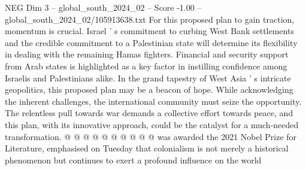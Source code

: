 \begin{textsample}{NEG Dim 3 – global\_south\_2024\_02 – Score -1.00 – global\_south\_2024\_02/105913638.txt}
For this proposed plan to gain traction, momentum is crucial.
Israel ' s commitment to curbing West Bank settlements and the credible commitment to a Palestinian state will determine its flexibility in dealing with the remaining Hamas fighters.
Financial and security support from Arab states is highlighted as a key factor in instilling confidence among Israelis and Palestinians alike.
In the grand tapestry of West Asia ' s intricate geopolitics, this proposed plan may be a beacon of hope.
While acknowledging the inherent challenges, the international community must seize the opportunity.
The relentless pull towards war demands a collective effort towards peace, and this plan, with its innovative approach, could be the catalyst for a much-needed transformation. @ @ @ @ @ @ @ @ @ @ was awarded the 2021 Nobel Prize for Literature, emphasised on Tuesday that colonialism is not merely a historical phenomenon but continues to exert a profound influence on the world

\end{textsample}
